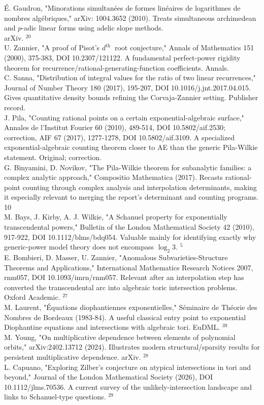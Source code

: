 \documentclass[10pt]{article}
\begin{document}
É. Gaudron, "Minorations simultanées de formes linéaires de logarithmes de nombres algébriques," arXiv: 1004.3652 (2010). Treats simultaneous archimedean and $p$-adic linear forms using adelic slope methods.\\
arXiv. ${ }^{20}$\\
U. Zannier, "A proof of Pisot's $d^{\text {th }}$ root conjecture," Annals of Mathematics 151 (2000), 375-383, DOI 10.2307/121122. A fundamental perfect-power rigidity theorem for recurrence/rational-generating-function coefficients. Annals.\\
C. Sanna, "Distribution of integral values for the ratio of two linear recurrences," Journal of Number Theory 180 (2017), 195-207, DOI 10.1016/j.jnt.2017.04.015. Gives quantitative density bounds refining the Corvaja-Zannier setting. Publisher record.\\
J. Pila, "Counting rational points on a certain exponential-algebraic surface," Annales de l'Institut Fourier 60 (2010), 489-514, DOI 10.5802/aif.2530; correction, AIF 67 (2017), 1277-1278, DOI 10.5802/aif.3109. A specialized exponential-algebraic counting theorem closer to AE than the generic Pila-Wilkie statement. Original; correction.\\
G. Binyamini, D. Novikov, "The Pila-Wilkie theorem for subanalytic families: a complex analytic approach," Compositio Mathematica (2017). Recasts rational-point counting through complex analysis and interpolation determinants, making it especially relevant to merging the report's determinant and counting programs.\\
10\\
M. Bays, J. Kirby, A. J. Wilkie, "A Schanuel property for exponentially transcendental powers," Bulletin of the London Mathematical Society 42 (2010), 917-922, DOI 10.1112/blms/bdq054. Valuable mainly for identifying exactly why generic-power model theory does not encompass $\log _{2} 3$. ${ }^{5}$\\
E. Bombieri, D. Masser, U. Zannier, "Anomalous Subvarieties-Structure Theorems and Applications," International Mathematics Research Notices 2007, rnm057, DOI 10.1093/imrn/rnm057. Relevant after an interpolation step has converted the transcendental arc into algebraic toric intersection problems. Oxford Academic. ${ }^{27}$\\
M. Laurent, "Équations diophantiennes exponentielles," Séminaire de Théorie des Nombres de Bordeaux (1983-84). A useful classical entry point to exponential Diophantine equations and intersections with algebraic tori. EuDML. ${ }^{39}$\\
M. Young, "On multiplicative dependence between elements of polynomial orbits," arXiv:2402.13712 (2024). Illustrates modern structural/sparsity results for persistent multiplicative dependence. arXiv. ${ }^{28}$\\
L. Capuano, "Exploring Zilber's conjecture on atypical intersections in tori and beyond," Journal of the London Mathematical Society (2026), DOI 10.1112/jlms.70536. A current survey of the unlikely-intersection landscape and links to Schanuel-type questions. ${ }^{29}$
\end{document}

